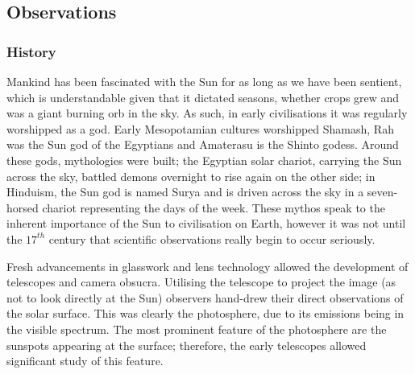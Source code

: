 \subsection{Observations}

\subsubsection{History}
Mankind has been fascinated with the Sun for as long as we have been sentient, which is understandable given that it dictated seasons, whether crops grew and was a giant burning orb in the sky.
As such, in early civilisations it was regularly worshipped as a god.
Early Mesopotamian cultures worshipped Shamash, Rah was the Sun god of the Egyptians and Amaterasu is the Shinto godess.
Around these gods, mythologies were built; the Egyptian solar chariot, carrying the Sun across the sky, battled demons overnight to rise again on the other side; in Hinduism, the Sun god is named Surya and is driven across the sky in a seven-horsed chariot representing the days of the week.
These mythos speak to the inherent importance of the Sun to civilisation on Earth, however it was not until the $17^{th}$ century that scientific observations really begin to occur seriously.


Fresh advancements in glasswork and lens technology allowed the development of telescopes and camera obsucra.
Utilising the telescope to project the image (as not to look directly at the Sun) observers hand-drew their direct observations of the solar surface.
This was clearly the photosphere, due to its emissions being in the visible spectrum. 
The most prominent feature of the photosphere are the sunspots appearing at the surface; therefore, the early telescopes allowed significant study of this feature.

